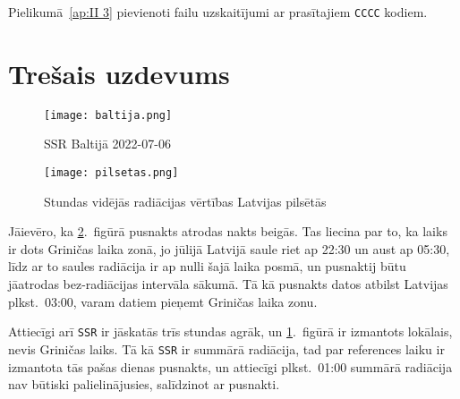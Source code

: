 \documentclass[12pt,a4paper]{article}
\begin{document}
Pielikumā~\ref{ap:II 3} pievienoti failu uzskaitījumi ar prasītajiem \texttt{CCCC} kodiem.

\section*{Trešais uzdevums}




\begin{figure}[ht!]
    \centering
    \texttt{[image: baltija.png]}
    \caption{SSR Baltijā 2022-07-06}\label{baltija}
\end{figure}
\begin{figure}[ht!]
    \centering
    \texttt{[image: pilsetas.png]}
    \caption{Stundas vidējās radiācijas vērtības Latvijas pilsētās}\label{pilsetas}
\end{figure}
Jāievēro, ka \ref{pilsetas}.~figūrā pusnakts atrodas nakts beigās. Tas liecina par to, ka laiks ir dots Griničas laika zonā, jo jūlijā Latvijā saule riet ap 22:30 un aust ap 05:30, līdz ar to saules radiācija ir ap nulli šajā laika posmā,
un pusnaktij būtu jāatrodas bez-radiācijas intervāla sākumā. Tā kā pusnakts datos atbilst Latvijas plkst.~03:00, varam datiem pieņemt Griničas laika zonu.


Attiecīgi arī \texttt{SSR} ir jāskatās trīs stundas agrāk, un \ref{baltija}.~figūrā ir izmantots lokālais, nevis Griničas laiks. Tā kā \texttt{SSR} ir summārā radiācija, tad par references laiku ir izmantota tās pašas dienas pusnakts, un attiecīgi plkst.~01:00 summārā radiācija nav būtiski palielinājusies, salīdzinot ar pusnakti.


\newpage
\appendix
\end{document}
